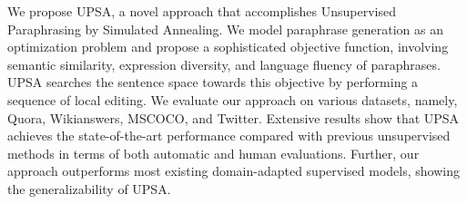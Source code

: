 We propose UPSA, a novel approach that accomplishes Unsupervised Paraphrasing by Simulated Annealing. We model paraphrase generation as an optimization problem and propose a sophisticated objective function, involving semantic similarity, expression diversity, and language fluency of paraphrases. UPSA searches the sentence space towards this objective by performing a sequence of local editing. We evaluate our approach on various datasets, namely, Quora, Wikianswers, MSCOCO, and Twitter. Extensive results show that UPSA achieves the state-of-the-art performance compared with previous unsupervised methods in terms of both automatic and human evaluations. Further, our approach  outperforms most existing domain-adapted supervised models, showing the generalizability of UPSA.
